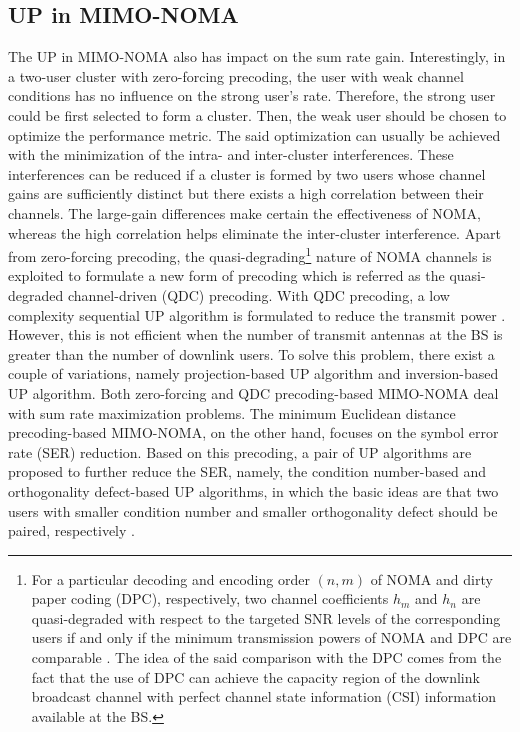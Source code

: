 \documentclass[10pt,final,journal,a4paper,twoside,twocolumn,romanappendices]{IEEEtran}
\theoremstyle{myremark}
\theoremstyle{myremark}
\begin{document}
\subsection{UP in MIMO-NOMA}
The UP in MIMO-NOMA also has impact on the sum rate gain. Interestingly, in a two-user cluster with zero-forcing precoding, the user with weak channel conditions has no influence on the strong user's rate. Therefore, the strong user could be first selected to form a cluster. Then, the weak user should be chosen to optimize the performance metric. The said optimization can usually be achieved with the minimization of the intra- and inter-cluster interferences. These interferences can be reduced if a cluster is formed by two users whose channel gains are sufficiently distinct but there exists a high correlation between their channels. The large-gain differences make certain the effectiveness of NOMA, whereas the high correlation helps eliminate the inter-cluster interference. Apart from zero-forcing precoding, the quasi-degrading\footnote[1]{For a particular decoding and encoding order $(n,m)$ of NOMA and dirty paper coding (DPC), respectively, two channel coefficients $h_m$ and $h_n$ are quasi-degraded with respect to the targeted SNR levels of the corresponding users if and only if the minimum transmission powers of NOMA and DPC are comparable \cite{24}. The idea of the said comparison with the DPC comes from the fact that the use of DPC can achieve the capacity region of the downlink broadcast channel with perfect channel state information (CSI) information available at the BS.} nature of NOMA channels is exploited to formulate a new form of precoding which is referred as the quasi-degraded channel-driven (QDC) precoding. With QDC precoding, a low complexity sequential UP algorithm is formulated to reduce the transmit power \cite{24}. However, this is not efficient when the number of transmit antennas at the BS is greater than the number of downlink users. To solve this problem, there exist a couple of variations, namely projection-based UP algorithm and inversion-based UP algorithm. Both zero-forcing and QDC precoding-based MIMO-NOMA deal with sum rate maximization problems. The minimum Euclidean distance precoding-based MIMO-NOMA, on the other hand, focuses on the symbol error rate (SER) reduction. Based on this precoding, a pair of UP algorithms are proposed to further reduce the SER, namely, the condition number-based and orthogonality defect-based UP algorithms, in which the basic ideas are that two users with smaller condition number and smaller orthogonality defect should be paired, respectively \cite{28}.
\end{document}
